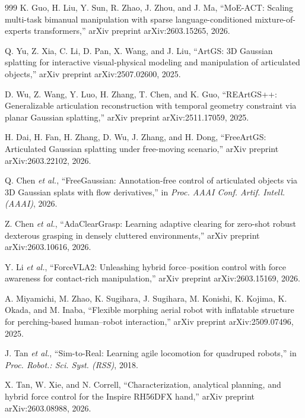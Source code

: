 ﻿\documentclass[11pt,a4paper]{article}
\begin{document}
\begin{thebibliography}{999}
K. Guo, H. Liu, Y. Sun, R. Zhao, J. Zhou, and J. Ma, ``MoE-ACT: Scaling multi-task bimanual manipulation with sparse language-conditioned mixture-of-experts transformers,'' arXiv preprint arXiv:2603.15265, 2026.

Q. Yu, Z. Xia, C. Li, D. Pan, X. Wang, and J. Liu, ``{ArtGS}: {3D} Gaussian splatting for interactive visual-physical modeling and manipulation of articulated objects,'' arXiv preprint arXiv:2507.02600, 2025.

D. Wu, Z. Wang, Y. Luo, H. Zhang, T. Chen, and K. Guo, ``{REArtGS++}: Generalizable articulation reconstruction with temporal geometry constraint via planar Gaussian splatting,'' arXiv preprint arXiv:2511.17059, 2025.

H. Dai, H. Fan, H. Zhang, D. Wu, J. Zhang, and H. Dong, ``{FreeArtGS}: Articulated Gaussian splatting under free-moving scenario,'' arXiv preprint arXiv:2603.22102, 2026.

Q. Chen \textit{et al.}, ``{FreeGaussian}: Annotation-free control of articulated objects via {3D} Gaussian splats with flow derivatives,'' in \textit{Proc. AAAI Conf. Artif. Intell. (AAAI)}, 2026.

Z. Chen \textit{et al.}, ``{AdaClearGrasp}: Learning adaptive clearing for zero-shot robust dexterous grasping in densely cluttered environments,'' arXiv preprint arXiv:2603.10616, 2026.

Y. Li \textit{et al.}, ``{ForceVLA}2: Unleashing hybrid force--position control with force awareness for contact-rich manipulation,'' arXiv preprint arXiv:2603.15169, 2026.

A. Miyamichi, M. Zhao, K. Sugihara, J. Sugihara, M. Konishi, K. Kojima, K. Okada, and M. Inaba, ``Flexible morphing aerial robot with inflatable structure for perching-based human--robot interaction,'' arXiv preprint arXiv:2509.07496, 2025.

J. Tan \textit{et al.}, ``{Sim-to-Real}: Learning agile locomotion for quadruped robots,'' in \textit{Proc. Robot.: Sci. Syst. (RSS)}, 2018.

X. Tan, W. Xie, and N. Correll, ``Characterization, analytical planning, and hybrid force control for the Inspire {RH}56{DFX} hand,'' arXiv preprint arXiv:2603.08988, 2026.


\end{thebibliography}
\end{document}
